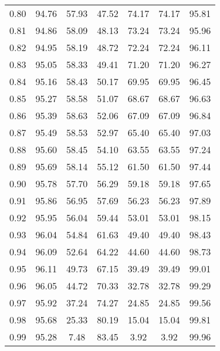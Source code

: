 \begin{tabular}{|c|c|c|c|c|c|c|}
      0.80 &     94.76 &     57.93 &      47.52 &   74.17 &      74.17 &         95.81 \\
      0.81 &     94.86 &     58.09 &      48.13 &   73.24 &      73.24 &         95.96 \\
      0.82 &     94.95 &     58.19 &      48.72 &   72.24 &      72.24 &         96.11 \\
      0.83 &     95.05 &     58.33 &      49.41 &   71.20 &      71.20 &         96.27 \\
      0.84 &     95.16 &     58.43 &      50.17 &   69.95 &      69.95 &         96.45 \\
      0.85 &     95.27 &     58.58 &      51.07 &   68.67 &      68.67 &         96.63 \\
      0.86 &     95.39 &     58.63 &      52.06 &   67.09 &      67.09 &         96.84 \\
      0.87 &     95.49 &     58.53 &      52.97 &   65.40 &      65.40 &         97.03 \\
      0.88 &     95.60 &     58.45 &      54.10 &   63.55 &      63.55 &         97.24 \\
      0.89 &     95.69 &     58.14 &      55.12 &   61.50 &      61.50 &         97.44 \\
      0.90 &     95.78 &     57.70 &      56.29 &   59.18 &      59.18 &         97.65 \\
      0.91 &     95.86 &     56.95 &      57.69 &   56.23 &      56.23 &         97.89 \\
      0.92 &     95.95 &     56.04 &      59.44 &   53.01 &      53.01 &         98.15 \\
      0.93 &     96.04 &     54.84 &      61.63 &   49.40 &      49.40 &         98.43 \\
      0.94 &     96.09 &     52.64 &      64.22 &   44.60 &      44.60 &         98.73 \\
      0.95 &     96.11 &     49.73 &      67.15 &   39.49 &      39.49 &         99.01 \\
      0.96 &     96.05 &     44.72 &      70.33 &   32.78 &      32.78 &         99.29 \\
      0.97 &     95.92 &     37.24 &      74.27 &   24.85 &      24.85 &         99.56 \\
      0.98 &     95.68 &     25.33 &      80.19 &   15.04 &      15.04 &         99.81 \\
      0.99 &     95.28 &      7.48 &      83.45 &    3.92 &       3.92 &         99.96 \\
\bottomrule
\end{tabular}

